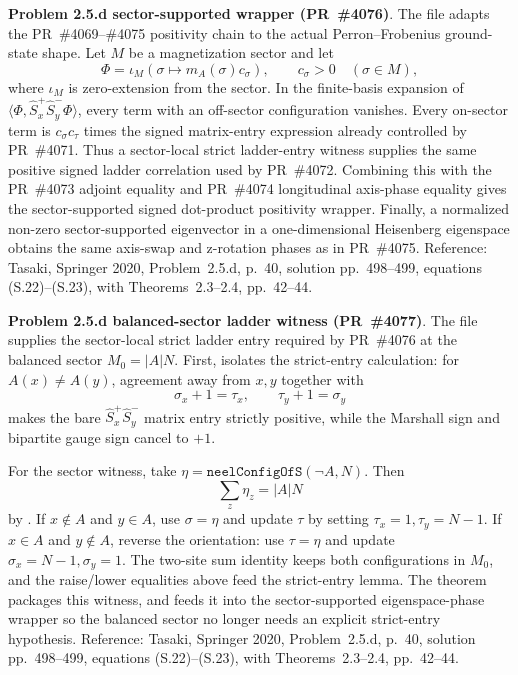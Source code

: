 \documentclass[a4paper,11pt]{article}
\begin{document}
\textbf{Problem 2.5.d sector-supported wrapper (PR~\#4076)}.
The file 
adapts the PR~\#4069--\#4075 positivity chain to the actual
Perron--Frobenius ground-state shape.  Let \(M\) be a magnetization sector and
let
\[
  \Phi=\iota_M(\sigma\mapsto m_A(\sigma)c_\sigma),
  \qquad c_\sigma>0\quad(\sigma\in M),
\]
where \(\iota_M\) is zero-extension from the sector.  In the finite-basis
expansion of
\(\langle\Phi,\hat S_x^+\hat S_y^-\Phi\rangle\), every term with an
off-sector configuration vanishes.  Every on-sector term is
\(c_\sigma c_\tau\) times the signed matrix-entry expression already
controlled by PR~\#4071.  Thus a sector-local strict ladder-entry witness
supplies the same positive signed ladder correlation used by PR~\#4072.
Combining this with the PR~\#4073 adjoint equality and PR~\#4074 longitudinal
axis-phase equality gives the sector-supported signed dot-product positivity
wrapper.  Finally, a normalized non-zero sector-supported eigenvector in a
one-dimensional Heisenberg eigenspace obtains the same axis-swap and
z-rotation phases as in PR~\#4075.  Reference: Tasaki, Springer 2020,
Problem~2.5.d, p.~40, solution pp.~498--499, equations (S.22)--(S.23), with
Theorems~2.3--2.4, pp.~42--44.

\textbf{Problem 2.5.d balanced-sector ladder witness (PR~\#4077)}.
The file 
supplies the sector-local strict ladder entry required by PR~\#4076 at the
balanced sector \(M_0=|A|N\).  First,
isolates the strict-entry calculation: for \(A(x)\ne A(y)\), agreement away
from \(x,y\) together with
\[
  \sigma_x+1=\tau_x,\qquad \tau_y+1=\sigma_y
\]
makes the bare \(\hat S_x^+\hat S_y^-\) matrix entry strictly positive, while
the Marshall sign and bipartite gauge sign cancel to \(+1\).

For the sector witness, take
\(\eta=\texttt{neelConfigOfS}(\neg A,N)\).  Then
\[
  \sum_z \eta_z = |A|N
\]
by .  If \(x\notin A\) and \(y\in A\),
use \(\sigma=\eta\) and update \(\tau\) by setting
\(\tau_x=1,\tau_y=N-1\).  If \(x\in A\) and \(y\notin A\), reverse the
orientation: use \(\tau=\eta\) and update \(\sigma_x=N-1,\sigma_y=1\).
The two-site sum identity  keeps both
configurations in \(M_0\), and the raise/lower equalities above feed the
strict-entry lemma.  The theorem
packages this witness, and
feeds it into the sector-supported eigenspace-phase wrapper so the balanced
sector no longer needs an explicit strict-entry hypothesis.  Reference:
Tasaki, Springer 2020, Problem~2.5.d, p.~40, solution pp.~498--499, equations
(S.22)--(S.23), with Theorems~2.3--2.4, pp.~42--44.
\end{document}
